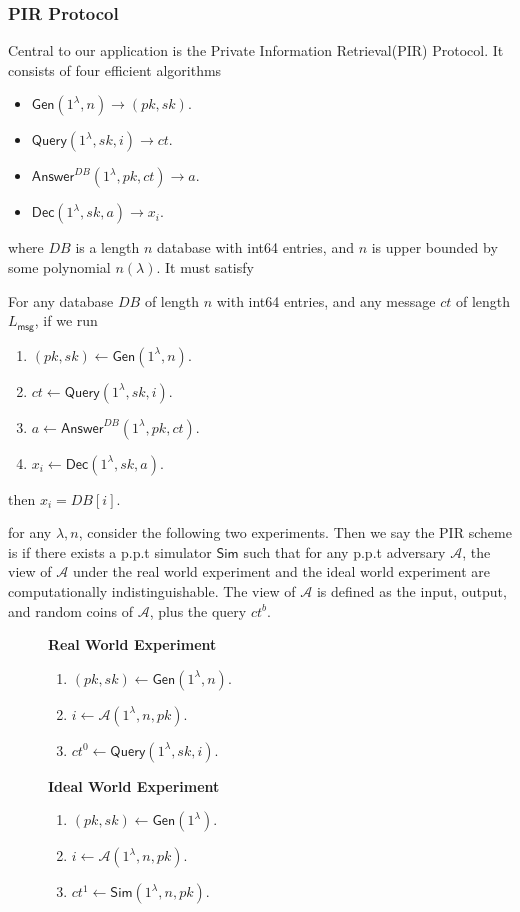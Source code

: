 \documentclass[sigconf, nonacm, balance=false, natbib=false, screen]{acmart}
\newcommand{\gen}{\mathsf{Gen}}
\newcommand{\dec}{\mathsf{Dec}}
\newcommand{\msg}{\mathsf{msg}}
\newcommand{\query}{\mathsf{Query}}
\newcommand{\answer}{\mathsf{Answer}}
\newcommand{\Sim}{\mathsf{Sim}}
\newcommand{\cA}{\mathcal{A}}
\begin{document}
\subsubsection{PIR Protocol}
Central to our application is the Private Information Retrieval(PIR) Protocol. It consists of four efficient algorithms
\begin{itemize}
    \item $\gen(1^{\lambda}, n) \to (pk, sk)$.
    \item $\query(1^{\lambda}, sk, i) \to ct$.
    \item $\answer^{DB}(1^{\lambda}, pk, ct) \to a$.
    \item $\dec(1^{\lambda}, sk, a) \to x_i$.
\end{itemize}
where $DB$ is a length $n$ database with int64 entries, and $n$ is upper bounded by some polynomial $n(\lambda)$. It must satisfy
\begin{definition}[Correctness]
For any database $DB$ of length $n$ with int64 entries, and any message $ct$ of length $L_{\msg}$, if we run
\begin{enumerate}
    \item $(pk, sk) \leftarrow \gen(1^{\lambda}, n)$.
    \item $ct \leftarrow \query(1^{\lambda}, sk, i)$.
    \item $a \leftarrow \answer^{DB}(1^{\lambda}, pk, ct)$.
    \item $x_i \leftarrow \dec(1^{\lambda}, sk, a)$.
\end{enumerate}
then $x_i = DB[i]$.
\end{definition}
\begin{definition}[Privacy]
for any $\lambda, n$, consider the following two experiments. Then we say the PIR scheme is  if there exists a p.p.t simulator $\Sim$ such that for any p.p.t adversary $\cA$, the view of $\cA$ under the real world experiment and the ideal world experiment are computationally indistinguishable. The view of $\cA$ is defined as the input, output, and random coins of $\cA$, plus the query $ct^b$.
\begin{figure}[h!]
\begin{framed}
\textbf{Real World Experiment}
\begin{enumerate}
    \item $(pk, sk) \leftarrow \gen(1^{\lambda}, n).$
    \item $i \leftarrow \cA(1^{\lambda}, n, pk)$.
    \item $ct^0 \leftarrow \query(1^{\lambda}, sk, i)$.
\end{enumerate}
\textbf{Ideal World Experiment}
\begin{enumerate}
    \item $(pk, sk) \leftarrow \gen(1^{\lambda}).$
    \item $i \leftarrow \cA(1^{\lambda}, n, pk)$.
    \item $ct^1 \leftarrow \Sim(1^{\lambda}, n, pk)$.
\end{enumerate}
\end{framed}
\end{figure}
\end{definition}
\end{document}
